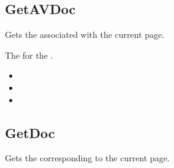 \documentclass[letterpaper,12pt,english,openany,oneside]{sphinxmanual}
\begin{document}
\subsection{GetAVDoc}
\label{\detokenize{IAC_API_OLE_Objects:getavdoc-1}}\label{\detokenize{IAC_API_OLE_Objects:id6}}
Gets the  associated with the current page.


\begin{sphinxVerbatim}[commandchars=\\\{\}]
 
\end{sphinxVerbatim}


The  for the .

\label{\detokenize{IAC_API_OLE_Objects:related-methods-53}}
\begin{itemize}
\item {} 
 

\item {} 
 

\item {} 
 

\end{itemize}




\subsection{GetDoc}
\label{\detokenize{IAC_API_OLE_Objects:getdoc}}
Gets the  corresponding to the current page.


\begin{sphinxVerbatim}[commandchars=\\\{\}]
 
\end{sphinxVerbatim}

\end{document}
